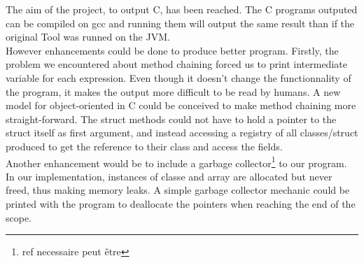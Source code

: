 
The aim of the project, to output C, has been reached. The C programs outputed can be compiled on gcc and running them will output the same result than if the original Tool was runned on the JVM.\\
However enhancements could be done to produce better program. Firstly, the problem we encountered about method chaining forced us to print intermediate variable for each expression. Even though it doesn't change the functionnality of the program, it makes the output more difficult to be read by humans. A new model for object-oriented in C could be conceived to make method chaining more straight-forward. The struct methods could not have to hold a pointer to the struct itself as first argument, and instead accessing a registry of all classes/struct produced to get the reference to their class and access the fields.\\
Another enhancement would be to include a garbage collector\footnote{ref necessaire peut être} to our program. In our implementation, instances of classe and array are allocated but never freed, thus making memory leaks. A simple garbage collector mechanic could be printed with the program to deallocate the pointers when reaching the end of the scope. 
\newline
